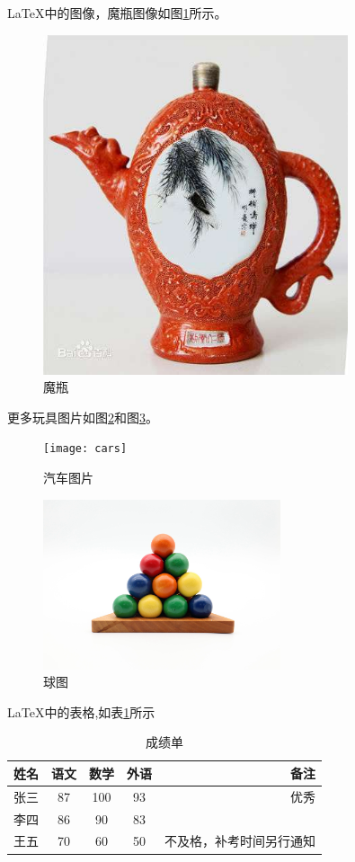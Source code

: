 \documentclass{ctexart}
\begin{document}
    \LaTeX 中的图像，魔瓶图像如图\ref{bottle}所示。
    \begin{figure}[htbp]
         \centering %
        \includegraphics[height=10cm]{bottle}
        \caption{魔瓶}
        \label{bottle}
    \end{figure}

     更多玩具图片如图\ref{cars}和图\ref{balls}。

     \begin{figure}[htbp]
         \centering %
        \texttt{[image: cars]}
        \caption{汽车图片}
        \label{cars}
    \end{figure}

     \begin{figure}[htbp]
         \centering %
        \includegraphics[height=5cm]{balls}
        \caption{球图}
        \label{balls}
    \end{figure}

    \newpage
    \LaTeX 中的表格,如表\ref{cjd}所示
    \begin{table}[htbp]
        \centering
        \begin{tabular}{|l|c|c|c|r|}
            \hline
            姓名&语文&数学&外语&备注\\
            \hline
            张三&87&100&93&优秀\\
            \hline
            李四&86&90&83&\\
            \hline
            王五&70&60&50&不及格，补考时间另行通知\\
            \hline
        \end{tabular}
        \caption{成绩单}
        \label{cjd}
    \end{table}
\end{document}
